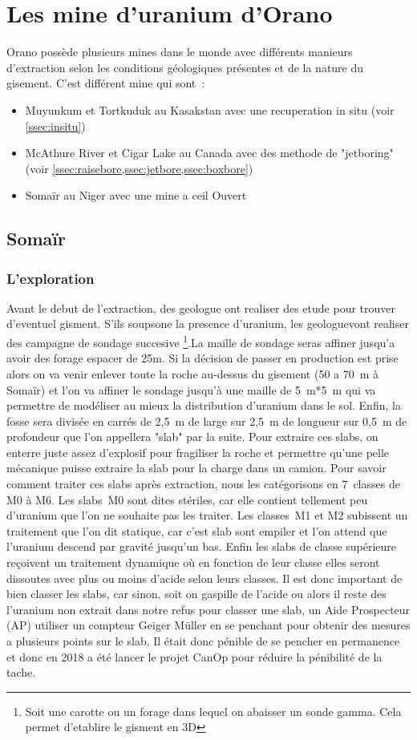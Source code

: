 \section{Les mine d'uranium d'Orano}
Orano possède plusieurs mines dans le monde avec différents manieurs d'extraction selon les conditions géologiques présentes et de la nature du gisement. C'est différent mine qui sont~:
\begin{itemize}
    \item Muyunkum et Tortkuduk au Kasakstan avec une recuperation in situ (voir \cref{ssec:insitu})
    \item McAthure River et Cigar Lake au Canada avec des methode de "jetboring" (voir \cref{ssec:raisebore,ssec:jetbore,ssec:boxbore})
    \item Somaïr au Niger avec une mine a ceil Ouvert
\end{itemize}

\subsection{Somaïr}
\subsubsection{L'exploration}
\par Avant le debut de l'extraction, des geologue ont realiser des etude pour trouver d'eventuel gisment. S'ils soupsone la presence d'uranium, les geologuevont realiser des campagne de sondage succesive \footnote{Soit une carotte ou un forage dans lequel on abaisser un sonde gamma. Cela permet d'etablire le gisment en 3D}.La maille de sondage seras affiner jusqu'a avoir des forage espacer de 25m. Si la décision de passer en production est prise alors on va venir enlever toute la roche au-dessus du gisement (50 a 70~m à Somaïr) et l’on va affiner le sondage jusqu'à une maille de 5~m*5~m qui va permettre de modéliser au mieux la distribution d'uranium dans le sol. Enfin, la fosse sera divisée en carrés de 2,5~m de large sur 2,5~m de longueur sur 0,5~m de profondeur que l'on appellera "slab" par la suite. Pour extraire ces slabs, on enterre juste assez d'explosif pour fragiliser la roche et permettre qu'une pelle mécanique puisse extraire la slab pour la charge dans un camion. Pour savoir comment traiter ces slabs  après extraction, nous les catégorisons en 7~classes de M0 à M6. Les slabs~M0 sont dites stériles, car elle contient tellement peu d'uranium que l'on ne souhaite pas les traiter. Les classes~M1 et M2 subissent un traitement que l'on dit statique, car c'est slab sont empiler et l’on attend que l'uranium descend par gravité jusqu'un bas. Enfin les slabs de classe supérieure reçoivent un traitement dynamique où en fonction de leur classe elles seront dissoutes avec plus ou moins d'acide selon leurs classes. Il est donc important de bien classer les slabs, car sinon, soit on gaspille  de l'acide ou alors il reste des l'uranium non extrait dans notre refus
\paravant pour classer une slab, un Aide Prospecteur (AP) utiliser un compteur Geiger Müller en se penchant pour obtenir des mesures a plusieurs points sur le slab. Il était donc pénible de se pencher en permanence et donc en 2018 a été lancer le projet CanOp pour réduire la pénibilité de la tache.